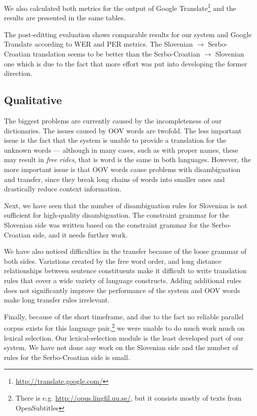 We also calculated both metrics for the output of Google Translate\footnote{\url{http://translate.google.com/}} 
and the results are presented in the same tables. 

The post-editting evaluation shows comparable results for our system
and Google Translate according to WER and PER metrics.  The Slovenian
$\rightarrow$ Serbo-Croatian translation seems to be better than the
Serbo-Croatian $\rightarrow$ Slovenian one which is due to the fact
that more effort was put into developing the former direction.



\subsection{Qualitative}
The biggest problems are currently caused by the incompleteness of our dictionaries.
The issues caused by OOV words are twofold.
The less important issue is the fact that the system is unable to provide a translation for the unknown words ---
although in many cases, such as with proper names, these may result in \emph{free rides}, that is word
is the same in both languages.
However, the more important issue is that OOV words cause problems with disambiguation and transfer, since they
break long chains of words into smaller ones and drastically reduce context information. 

Next, we have seen that the number of disambiguation rules for Slovenian is not sufficient for high-quality disambiguation. 
The constraint grammar for the Slovenian side was written based on the constraint grammar for the Serbo-Croatian side,
and it needs further work.

We have also noticed difficulties in the transfer because of the loose
grammar of both sides. Variations created by the free word order, and
long distance relationships between sentence constituents make it
difficult to write translation rules that cover a wide variety of
language constructs. Adding additional rules does not significantly
improve the performance of the system and OOV words make long transfer
rules irrelevant.

Finally, because of the short timeframe, and due to the fact no
reliable parallel corpus exists for this language pair,\footnote{There
is e.g. \url{http://opus.lingfil.uu.se/}, but it consists mostly of
texts from OpenSubtitles} we were unable to do much work much on lexical selection.
Our lexical-selection module is the least developed part of our
system. We have not done any work on the Slovenian side and the number
of rules for the Serbo-Croatian side is small.
